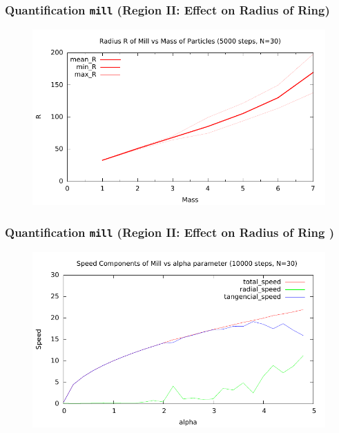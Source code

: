 \documentclass[compress]{beamer}
\begin{document}
\begin{frame}
	\frametitle{Quantification \texttt{mill} \small (Region II: Effect on Radius of Ring)}
	\begin{figure}[H]
		\includegraphics[width=1. \columnwidth]{../plots/mill_II_radius_mass.pdf}
	\end{figure}
\end{frame}


\begin{frame}
	\frametitle{Quantification \texttt{mill} \small (Region II: Effect on Radius of Ring )} \normalsize	
	\begin{figure}[H]
		\includegraphics[width=1. \columnwidth]{../plots/mill_II_speeds_alpha_10000.pdf}
	\end{figure}	
\end{frame}
\end{document}
